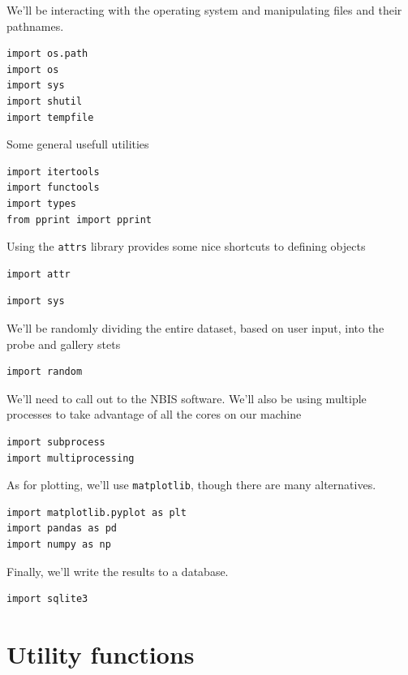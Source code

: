 We'll be interacting with the operating system and manipulating files
and their pathnames.

\begin{lstlisting}
import os.path
import os
import sys
import shutil
import tempfile
\end{lstlisting}

Some general usefull utilities

\begin{lstlisting}
import itertools
import functools
import types
from pprint import pprint
\end{lstlisting}

Using the \texttt{attrs} library provides some nice shortcuts to
defining objects

\begin{lstlisting}
import attr
\end{lstlisting}

\begin{lstlisting}
import sys
\end{lstlisting}

We'll be randomly dividing the entire dataset, based on user input, into
the probe and gallery stets

\begin{lstlisting}
import random
\end{lstlisting}

We'll need to call out to the NBIS software. We'll also be using
multiple processes to take advantage of all the cores on our machine

\begin{lstlisting}
import subprocess
import multiprocessing
\end{lstlisting}

As for plotting, we'll use \texttt{matplotlib}, though there are many
alternatives.

\begin{lstlisting}
import matplotlib.pyplot as plt
import pandas as pd
import numpy as np
\end{lstlisting}

Finally, we'll write the results to a database.

\begin{lstlisting}
import sqlite3
\end{lstlisting}

\section{Utility functions}\label{utility-functions}

